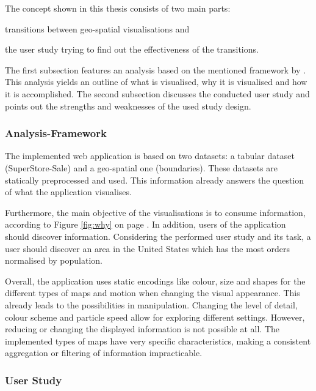 \cbstart
The concept shown in this thesis consists of two main parts:
\begin{enumerate*}[label={(\arabic*)}]
\item transitions between geo-spatial visualisations and
\item the user study trying to find out the effectiveness of the transitions.
\end{enumerate*}

The first subsection features an analysis based on the mentioned framework by \citeauthor{Munzner2014}. This analysis yields an outline of what is visualised, why it is visualised and how it is accomplished. The second subsection discusses the conducted user study and points out the strengths and weaknesses of the used study design.
\cbend

\subsubsection{Analysis-Framework}
The implemented web application is based on two datasets: a tabular dataset (SuperStore-Sale) and a geo-spatial one (boundaries). These datasets are statically preprocessed and used. This information already answers the question of what the application visualises.

\cbstart
Furthermore, the main objective of the visualisations is to consume information, according to Figure \ref{fig:why} on page \pageref{fig:why}. In addition, users of the application should discover information. Considering the performed user study and its task, a user should discover an area in the United States which has the most orders normalised by population.
\cbend

Overall, the application uses static encodings like colour, size and shapes for the different types of maps and motion when changing the visual appearance. This already leads to the possibilities in manipulation. Changing the level of detail, colour scheme and particle speed allow for exploring different settings. However, reducing or changing the displayed information is not possible at all. The implemented types of maps have very specific characteristics, making a consistent aggregation or filtering of information impracticable.

\newpage
\subsubsection{User Study}
\label{s:discussion-study}
